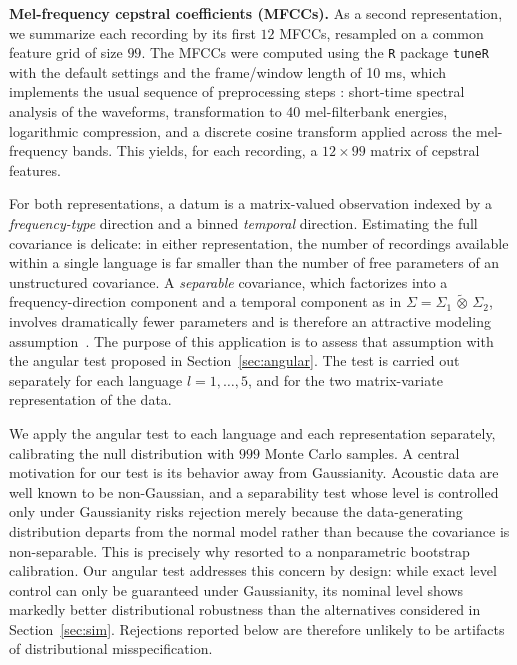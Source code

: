 \documentclass[12pt]{article}
\newcommand{\ot}{\,\tilde\otimes\,}
\begin{document}
\textbf{Mel-frequency cepstral coefficients (MFCCs).}
As a second representation, we summarize each recording by its first $12$ MFCCs, resampled on a common feature grid of size $99$.  The MFCCs were computed using the \texttt{R} package \texttt{tuneR} \citep{tuneR} with the default settings and the frame/window length of 10 ms, which implements the usual sequence of preprocessing steps \citep[see][for details]{sueur2018sound}: short-time spectral analysis of the waveforms, transformation to 40 mel-filterbank energies, logarithmic compression, and a discrete cosine transform applied across the mel-frequency bands. This yields, for each recording, a $12\times 99$ matrix of cepstral features.

For both representations, a datum is a matrix-valued 
observation indexed by a \emph{frequency-type} direction and a binned \emph{temporal} direction. Estimating the full covariance is delicate: in either representation, the number of recordings available within a single language is far smaller than the number of free parameters of an unstructured covariance. A \emph{separable} covariance, which factorizes into a frequency-direction component and a temporal component as in $\Sigma=\Sigma_{1}\ot\Sigma_{2}$, involves dramatically fewer parameters and is therefore an attractive modeling assumption~\citep{pigoli2018statistical}. The purpose of this application is to assess that assumption with the angular test proposed in Section~\ref{sec:angular}. The test is carried out separately for each language $l=1,\dots,5$, and for the two matrix-variate representation of the data.

We apply the angular test to each language and each representation separately, calibrating the null distribution with $999$ Monte Carlo samples. A central motivation for our test is its behavior away from Gaussianity. Acoustic data are well known to be non-Gaussian, and a separability test whose level is controlled only under Gaussianity risks rejection merely because the data-generating distribution departs from the normal model rather than because the covariance is non-separable. This is precisely why \citet{aston2017tests} resorted to a nonparametric bootstrap calibration. Our angular test addresses this concern by design: while exact level control can only be guaranteed under Gaussianity, its nominal level shows markedly better distributional robustness than the alternatives considered in Section~\ref{sec:sim}. Rejections reported below are therefore unlikely to be artifacts of distributional misspecification.
\end{document}
